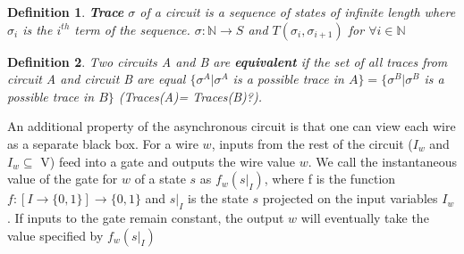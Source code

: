 \documentclass{article}
\newtheorem*{definition}{Definition}
\begin{document}
\begin{definition} \textbf{Trace} $\sigma$ of a circuit is a sequence of states of infinite length where $\sigma_i$ is the $i^{th}$ term of the sequence.  $\sigma: \mathbb{N} \to S$ and $T(\sigma_i,\sigma_{i+1})$ for $\forall i \in \mathbb{N}$\end{definition} 

\begin{definition} Two circuits A and B are \textbf{equivalent} if the set of all traces from circuit A and circuit B are equal $\{\sigma^A |\sigma^A$ is a possible trace in $A\}=\{\sigma^B |\sigma^B$ is a possible trace in $B\}$ (Traces(A)= Traces(B)?).
\end{definition}

An additional property of the asynchronous circuit is that one can view each wire as a separate black box.  For a wire $w$, inputs from the rest of the circuit ($I_w$ and $I_w \subseteq$ V) feed into a gate and outputs the wire value $w$.  We call the instantaneous value of the gate for $w$ of a state $s$ as $f_w(s|_I)$, where f is the function $f:[I \to \{0,1\}] \to \{0,1\}$ and $s|_I$ is the state $s$ projected on the input variables $I_w$.  If inputs to the gate remain constant, the output $w$ will eventually take the value specified by $f_w(s|_I)$  %
\newline
\end{document}
